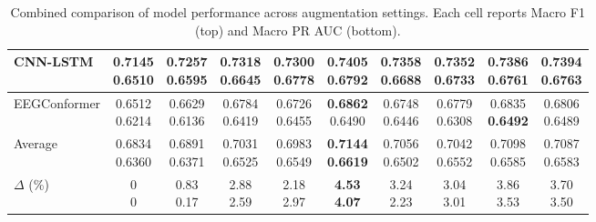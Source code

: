 \begin{table}[H]
{\begin{tabular}{lccccccccc}
CNN-LSTM
& \makecell{0.7145 \\ 0.6510}
& \makecell{0.7257 \\ 0.6595}
& \makecell{0.7318 \\ 0.6645}
& \makecell{0.7300 \\ 0.6778}
& \makecell{\textbf{0.7405} \\ \textbf{0.6792}}
& \makecell{0.7358 \\ 0.6688}
& \makecell{0.7352 \\ 0.6733}
& \makecell{0.7386 \\ 0.6761}
& \makecell{0.7394 \\ 0.6763} \\
\midrule

EEGConformer
& \makecell{0.6512 \\ 0.6214}
& \makecell{0.6629 \\ 0.6136}
& \makecell{0.6784 \\ 0.6419}
& \makecell{0.6726 \\ 0.6455}
& \makecell{\textbf{0.6862} \\ 0.6490}
& \makecell{0.6748 \\ 0.6446}
& \makecell{0.6779 \\ 0.6308}
& \makecell{0.6835 \\ \textbf{0.6492}}
& \makecell{0.6806 \\ 0.6489} \\
\midrule

Average
& \makecell{0.6834 \\ 0.6360}
& \makecell{0.6891 \\ 0.6371}
& \makecell{0.7031 \\ 0.6525}
& \makecell{0.6983 \\ 0.6549}
& \makecell{\textbf{0.7144} \\ \textbf{0.6619}}
& \makecell{0.7056 \\ 0.6502}
& \makecell{0.7042 \\ 0.6552}
& \makecell{0.7098 \\ 0.6585}
& \makecell{0.7087 \\ 0.6583} \\
\midrule

$\Delta$ (\%)
& \makecell{0 \\ 0}
& \makecell{0.83 \\ 0.17}
& \makecell{2.88 \\ 2.59}
& \makecell{2.18 \\ 2.97}
& \makecell{\textbf{4.53} \\ \textbf{4.07}}
& \makecell{3.24 \\ 2.23}
& \makecell{3.04 \\ 3.01}
& \makecell{3.86 \\ 3.53}
& \makecell{3.70 \\ 3.50} \\
\bottomrule
\end{tabular}%
}
\caption{Combined comparison of model performance across augmentation settings. Each cell reports Macro F1 (top) and Macro PR AUC (bottom).}
\label{tab:combined_aug_results}
\end{table}

